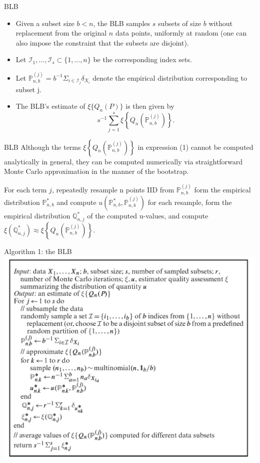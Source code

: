 \documentclass[12pt]{beamer}
\begin{document}
\begin{frame}{BLB}
\begin{itemize}
\item Given a subset size $b<n$, the BLB samples $s$ subsets of size $b$ without replacement from the original $n$ data points, uniformly at random (one can also impose the constraint
that the subsets are disjoint).
\item Let $\mathcal{I}_{1}, \ldots, \mathcal{I}_{s} \subset\{1, \ldots, n\}$ be the corresponding index sets.
\item Let $\mathbb{P}_{n, b}^{(j)}=b^{-1} \Sigma_{i \in \mathcal{I}_{j}} \delta_{X_{i}}$ denote the empirical distribution corresponding
to subset j.
\item The BLB’s estimate of $\xi\{Q_n(P)\}$ is then given by
\begin{equation}\tag{1}
s^{-1} \sum_{j=1}^{s} \xi\left\{Q_{n}\left(\mathbb{P}_{n, b}^{(j)}\right)\right\}.
\end{equation}
\end{itemize}
\end{frame}

\begin{frame}{BLB}
Although the terms $\xi\left\{Q_{n}\left(\mathbb{P}_{n, b}^{(j)}\right)\right\}$ in expression (1) cannot be computed analytically in general, they can be computed numerically via straightforward Monte Carlo approximation in the manner
of the bootstrap.

For each term $j$, repeatedly resample n points IID from $\mathbb{P}_{n, b}^{(j)}$ form the
empirical distribution $\mathbb{P}^{*}_{n,b}$ and compute $u\left(\mathbb{P}_{n, b}^{*}, \mathbb{P}_{n, b}^{(j)}\right)$ for each resample, form the empirical
distribution $\mathbb{Q}_{n,j}^{*}$ of the computed u-values, and compute $\xi\left(\mathbb{Q}_{n, j}^{*}\right) \approx \xi\left\{Q_{n}\left(\mathbb{P}_{n, b}^{(j)}\right)\right\}$.
\end{frame}

\begin{frame}{Algorithm 1: the BLB}
\includegraphics[scale=0.9]{table1.png}
\end{frame}
\end{document}
